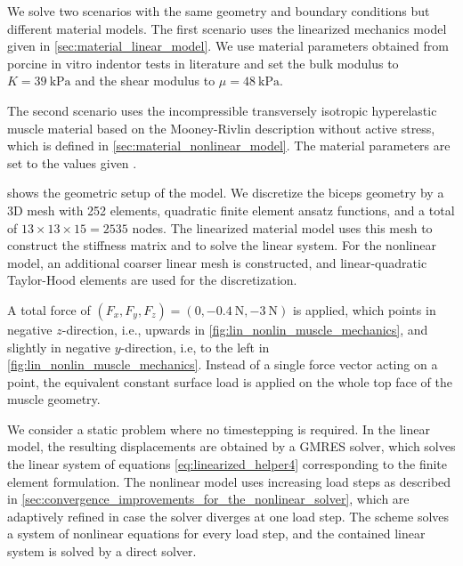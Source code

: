 We solve two scenarios with the same geometry and boundary conditions but different material models. The first scenario uses the linearized mechanics model given in \cref{sec:material_linear_model}. We use material parameters obtained from porcine in vitro indentor tests in literature \cite{schock1982vivo} and set the bulk modulus to $K=\SI{39}{\kilo\pascal}$ and the shear modulus to $\mu=\SI{48}{\kilo\pascal}$.

The second scenario uses the incompressible transversely isotropic hyperelastic muscle material based on the Mooney-Rivlin description without active stress, which is defined in \cref{sec:material_nonlinear_model}. The material parameters are set to the values given \cite{Heidlauf2016}.

 shows the geometric setup of the model. We discretize the biceps geometry by a 3D mesh with 252  elements, quadratic finite element ansatz functions,  and a total of $13 \times 13 \times 15 = 2535$ nodes.
The linearized material model uses this mesh to construct the stiffness matrix and to solve the linear system.
For the nonlinear model, an additional coarser linear mesh is constructed, and linear-quadratic Taylor-Hood elements are used for the discretization. 

A total force of $(F_x,F_y,F_z) = (0,\SI{-0.4}{\newton},\SI{-3}{\newton})$ is applied, which points in negative $z$-direction, i.e., upwards in \cref{fig:lin_nonlin_muscle_mechanics}, and slightly in negative $y$-direction, i.e, to the left in \cref{fig:lin_nonlin_muscle_mechanics}.
Instead of a single force vector acting on a point, the equivalent constant surface load is applied on the whole top face of the muscle geometry.

We consider a static problem where no timestepping is required. In the linear model, the resulting displacements are obtained by a GMRES solver, which solves the linear system of equations \cref{eq:linearized_helper4} corresponding  to the finite element formulation.
The nonlinear model uses increasing load steps as described in \cref{sec:convergence_improvements_for_the_nonlinear_solver}, which are adaptively refined in case the solver diverges at one load step. The scheme solves a system of nonlinear equations for every load step, and the contained linear system is solved by a direct solver.


